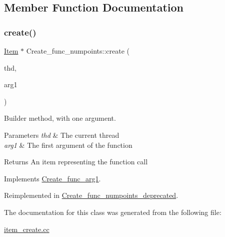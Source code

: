 \subsection{Member Function Documentation}
\mbox{\label{classCreate__func__numpoints_a11173c776240d156218d2605cc51379d}} 
\subsubsection{\texorpdfstring{create()}{create()}}
{\footnotesize\ttfamily \mbox{\hyperlink{classItem}{Item}} $\ast$ Create\+\_\+func\+\_\+numpoints\+::create (\begin{DoxyParamCaption}\item[{T\+HD $\ast$}]{thd,  }\item[{\mbox{\hyperlink{classItem}{Item}} $\ast$}]{arg1 }\end{DoxyParamCaption})\hspace{0.3cm}{\ttfamily [virtual]}}

Builder method, with one argument. 
\begin{DoxyParams}{Parameters}
{\em thd} & The current thread \\
\hline
{\em arg1} & The first argument of the function \\
\hline
\end{DoxyParams}
\begin{DoxyReturn}{Returns}
An item representing the function call 
\end{DoxyReturn}


Implements \mbox{\hyperlink{classCreate__func__arg1_a3e9a98f755cd82c3e762e334c955a8c9}{Create\+\_\+func\+\_\+arg1}}.



Reimplemented in \mbox{\hyperlink{classCreate__func__numpoints__deprecated_aa1535981a4695ba9499044699b0952e3}{Create\+\_\+func\+\_\+numpoints\+\_\+deprecated}}.



The documentation for this class was generated from the following file\+:\begin{DoxyCompactItemize}
\item 
\mbox{\hyperlink{item__create_8cc}{item\+\_\+create.\+cc}}\end{DoxyCompactItemize}
